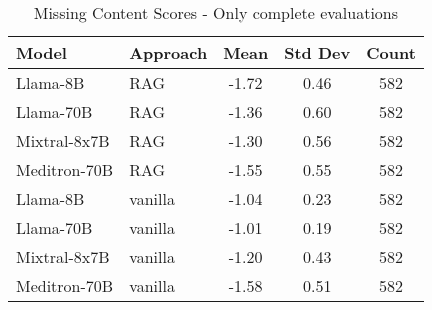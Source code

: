 \begin{table}[h]
\centering
\begin{tabular}{llccc}
\toprule
Model & Approach & Mean & Std Dev & Count \\
\midrule
Llama-8B & RAG & -1.72 & 0.46 & 582 \\
Llama-70B & RAG & -1.36 & 0.60 & 582 \\
Mixtral-8x7B & RAG & -1.30 & 0.56 & 582 \\
Meditron-70B & RAG & -1.55 & 0.55 & 582 \\
Llama-8B & vanilla & -1.04 & 0.23 & 582 \\
Llama-70B & vanilla & -1.01 & 0.19 & 582 \\
Mixtral-8x7B & vanilla & -1.20 & 0.43 & 582 \\
Meditron-70B & vanilla & -1.58 & 0.51 & 582 \\
\bottomrule
\end{tabular}
\caption{Missing Content Scores - Only complete evaluations}
\label{tab:missing_content_complete}
\end{table}